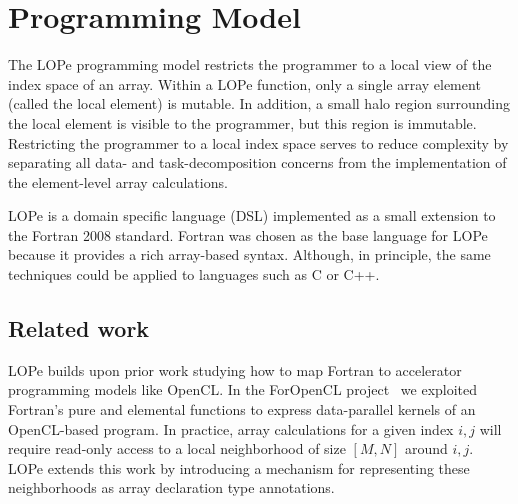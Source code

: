 \section{Programming Model}

The LOPe programming model
restricts the programmer to a local view of the index
space of an array.  Within a LOPe function, only a single array
element (called the local element) is mutable.  In addition, a small
halo region surrounding the local element is visible to the
programmer, but this region is immutable.  Restricting the programmer
to a local index space serves to reduce complexity by separating all
data- and task-decomposition concerns from the implementation of the
element-level array calculations.


LOPe is a domain specific language (DSL) implemented as a small extension to the Fortran 2008
standard.  Fortran was chosen as the base language for LOPe because it provides a rich array-based
syntax.  Although, in principle, the same techniques could be applied to languages such as C or C++.


\subsection{Related work}

LOPe builds upon prior work studying how to map Fortran to accelerator
programming models like OpenCL.  In the ForOpenCL project~\cite{Sottile:2013:FTE:2441516.2441520}
we exploited Fortran's pure and elemental functions to express
data-parallel kernels of an OpenCL-based program.  In practice, array
calculations for a given index $i,j$ will require read-only access to
a local neighborhood of size $[M,N]$ around $i,j$.  LOPe extends this work by introducing
a mechanism for representing these neighborhoods as array declaration
type annotations.

